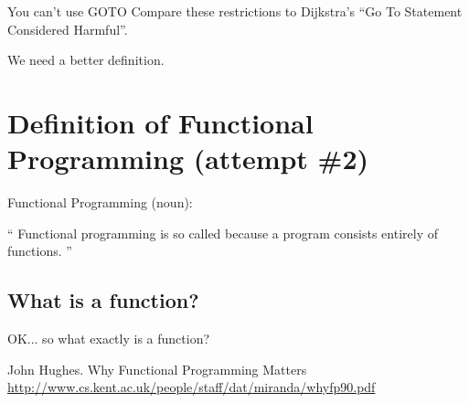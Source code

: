 \documentclass{beamer}
\begin{document}
\begin{frame}{You can't use GOTO}
Compare these restrictions to Dijkstra's
``Go To Statement Considered Harmful''.
\end{frame}

\begin{frame}{}
We need a better definition.
\end{frame}

\section{Definition of Functional Programming (attempt \#2)}

\begin{frame}{Functional Programming (noun):}

\begin{exampleblock}{}
  {\large ``
  Functional programming is so called because a program consists entirely of functions.
  ''}
  \vskip5mm
  \hspace*{}
\end{exampleblock}
\end{frame}

\subsection{What is a function?}
\begin{frame}{}
OK... so what exactly is a function?
\end{frame}

\begin{frame}[allowframebreaks]
  \begin{thebibliography}{10}
      John Hughes.
      \newblock Why Functional Programming Matters
      \newblock \url{http://www.cs.kent.ac.uk/people/staff/dat/miranda/whyfp90.pdf}
  \end{thebibliography}
\end{frame}
\end{document}
